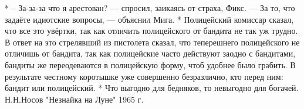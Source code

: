 *
– За-за-за что я арестован? --- спросил, заикаясь от страха, Фикс. --- За то, что задаёте идиотские вопросы, --- объяснил Мига. 
*
Полицейский комиссар сказал, что все это увёртки, так как отличить полицейского от бандита не так уж трудно. В ответ на это стрелявший из пистолета сказал, что теперешнего полицейского не отличишь от бандита, так как полицейские часто действуют заодно с бандитами, бандиты же переодеваются в полицейскую форму, чтоб удобнее было грабить. В результате честному коротышке уже совершенно безразлично, кто перед ним: бандит или полицейский. 
*
Что выгодно для бедняков, то невыгодно для богачей. 
Н.Н.Носов
"Незнайка на Луне"
1965 г.
